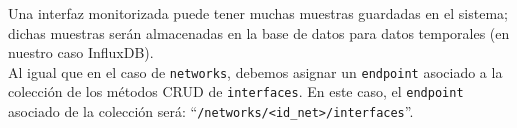 \documentclass[a4paper, oneside, 12pt]{book}
\begin{document}
	\noindent Una interfaz monitorizada puede tener muchas muestras guardadas en el sistema; dichas muestras serán almacenadas en la base de datos para datos temporales (en nuestro caso InfluxDB). \\
	
	\noindent Al igual que en el caso de \texttt{networks}, debemos asignar un \texttt{endpoint} asociado a la colección de los métodos CRUD de \texttt{interfaces}. En este caso, el \texttt{endpoint} asociado de la colección será: ``\texttt{/networks/<id\_net>/interfaces}''. \\
	
	\begin{table}[h!]
		\centering
\end{table}
\end{document}

